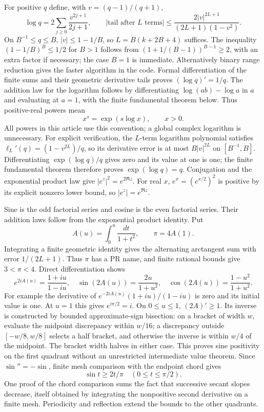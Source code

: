 For positive $q$ define, with $v=(q-1)/(q+1)$,
\[
 \log q=2\sum_{j\ge0}\frac{v^{2j+1}}{2j+1},\qquad
 |\text{tail after }L\text{ terms}|
 \le\frac{2|v|^{2L+1}}{(2L+1)(1-v^2)}.          \tag{F4}\label{eq:log-tail}
\]
On $B^{-1}\le q\le B$, $|v|\le1-1/B$, so
$L=B(k+2B+4)$ suffices. The inequality
$(1-1/B)^B\le1/2$ for $B>1$ follows from
$(1+1/(B-1))^{B-1}\ge2$, with an extra factor if necessary; the case
$B=1$ is immediate. Alternatively binary range reduction gives the
faster algorithm in the code. Formal differentiation of the finite sums
and their geometric derivative tails proves $(\log q)'=1/q$.
The addition law for the logarithm follows by differentiating
$\log(ab)-\log a$ in $a$ and evaluating at $a=1$, with the finite
fundamental theorem below. Thus positive-real powers mean
\[
 x^s=\exp(s\log x),\qquad x>0.
\]
All powers in this article use this convention; a global complex logarithm
is unnecessary.
For explicit verification, the $L$-term logarithm polynomial satisfies
$\ell_L'(q)=(1-v^{2L})/q$, so its derivative error is at most
$B|v|^{2L}$ on $[B^{-1},B]$. Differentiating
$\exp(\log q)/q$ gives zero and its value at one is one; the finite
fundamental theorem therefore proves $\exp(\log q)=q$.
Conjugation and the exponential product law give
$|e^z|^2=e^{2\Re z}$. For real $x$, $e^x=(e^{x/2})^2$ is positive
by its explicit nonzero lower bound, so $|e^z|=e^{\Re z}$.


Sine is the odd factorial series and cosine is the even factorial series. Their addition
laws follow from the exponential product identity. Put
\[
 A(u)=\int_0^u\frac{dt}{1+t^2},\qquad \pi=4A(1).
\]
Integrating a finite geometric identity gives the alternating arctangent
sum with error $1/(2L+1)$. Thus $\pi$ has a PR name, and finite rational
bounds give $3<\pi<4$. Direct differentiation shows
\[
 e^{2iA(u)}=\frac{1+iu}{1-iu},\quad
 \sin(2A(u))=\frac{2u}{1+u^2},\quad
 \cos(2A(u))=\frac{1-u^2}{1+u^2}.                \tag{F5}\label{eq:trig-param}
\]
For example the derivative of $e^{-2iA(u)}(1+iu)/(1-iu)$ is zero
and its initial value is one. At $u=1$ this gives $e^{i\pi/2}=i$.
On $0\le u\le1$, $(2A)'\ge1$. Its inverse is constructed by bounded
approximate-sign bisection: on a bracket of width $w$, evaluate the
midpoint discrepancy within $w/16$; a discrepancy outside $[-w/8,w/8]$
selects a half bracket, and otherwise the inverse is within $w/4$ of the
midpoint. The bracket width halves in either case. This proves sine
positivity on the first quadrant without an unrestricted intermediate
value theorem. Since $\sin''=-\sin$, finite mesh comparison with the
endpoint chord gives
\[
 \sin t\ge 2t/\pi\quad(0\le t\le\pi/2).       \tag{F6}\label{eq:sine-chord}
\]
One proof of the chord comparison sums the fact that successive secant
slopes decrease, itself obtained by integrating the nonpositive second
derivative on a finite mesh. Periodicity and reflection extend the
bounds to the other quadrants.


